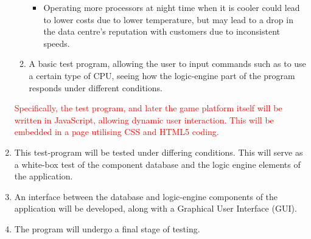 \begin{enumerate}
\begin{enumerate}
\begin{itemize}
\item Operating more processors at night time when it is cooler could lead to lower costs due to lower temperature, but may lead to a drop in the \gls{data centre}'s reputation with customers due to inconsistent speeds.
\end{itemize}

\item A basic test program, allowing the user to input commands such as to use a certain type of CPU, seeing how the logic-engine part of the program
responds under different conditions.
\end{enumerate}

\textcolor{red}{Specifically, the test program, and later the game platform itself will be written in JavaScript, allowing dynamic user interaction. This will be embedded in a page utilising CSS and HTML5 coding.}

\item 
This test-program will be tested under differing conditions. This will serve as a white-box test of the component database and the logic engine elements of the application.

\item An interface between the database and logic-engine components of the application will be developed, along with a Graphical User Interface (GUI).

\item The program will undergo a final stage of testing.
\end{enumerate}
